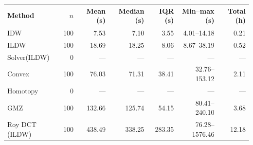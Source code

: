 \begin{tabular}{lrrrrrr}\toprule
Method & $n$ & Mean (s) & Median (s) & IQR (s) & Min--max (s) & Total (h) \\ \midrule
IDW & 100 & 7.53 & 7.10 & 3.55 & 4.01--14.18 & 0.21 \\
ILDW & 100 & 18.69 & 18.25 & 8.06 & 8.67--38.19 & 0.52 \\
Solver(ILDW) & 0 & --- & --- & --- & --- & --- \\
Convex & 100 & 76.03 & 71.31 & 38.41 & 32.76--153.12 & 2.11 \\
Homotopy & 0 & --- & --- & --- & --- & --- \\
GMZ & 100 & 132.66 & 125.74 & 54.15 & 80.41--240.10 & 3.68 \\
Roy DCT (ILDW) & 100 & 438.49 & 338.25 & 283.35 & 76.28--1576.46 & 12.18 \\
\bottomrule\end{tabular}
